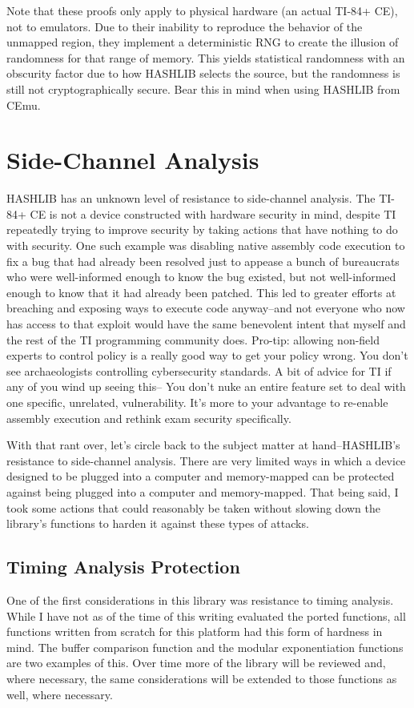 \documentclass[titlepage]{article}
\begin{document}
	Note that these proofs only apply to physical hardware (an actual TI-84+ CE), not to emulators. Due to their inability to reproduce the behavior of the unmapped region, they implement a deterministic RNG to create the illusion of randomness for that range of memory. This yields statistical randomness with an obscurity factor due to how HASHLIB selects the source, but the randomness is still not cryptographically secure. Bear this in mind when using HASHLIB from CEmu.
	
	\section{Side-Channel Analysis}
		HASHLIB has an unknown level of resistance to side-channel analysis. The TI-84+ CE is not a device constructed with hardware security in mind, despite TI repeatedly trying to improve security by taking actions that have nothing to do with security. One such example was disabling native assembly code execution to fix a bug that had already been resolved just to appease a bunch of bureaucrats who were well-informed enough to know the bug existed, but not well-informed enough to know that it had already been patched. This led to greater efforts at breaching and exposing ways to execute code anyway--and not everyone who now has access to that exploit would have the same benevolent intent that myself and the rest of the TI programming community does. Pro-tip: allowing non-field experts to control policy is a really good way to get your policy wrong. You don't see archaeologists controlling cybersecurity standards. A bit of advice for TI if any of you wind up seeing this-- You don't nuke an entire feature set to deal with one specific, unrelated, vulnerability. It's more to your advantage to re-enable assembly execution and rethink exam security specifically.
		
		With that rant over, let's circle back to the subject matter at hand--HASHLIB's resistance to side-channel analysis. There are very limited ways in which a device designed to be plugged into a computer and memory-mapped can be protected against being plugged into a computer and memory-mapped. That being said, I took some actions that could reasonably be taken without slowing down the library's functions to harden it against these types of attacks.
		
		\subsection{Timing Analysis Protection}
			One of the first considerations in this library was resistance to timing analysis. While I have not as of the time of this writing evaluated the ported functions, all functions written from scratch for this platform had this form of hardness in mind. The buffer comparison function and the modular exponentiation functions are two examples of this. Over time more of the library will be reviewed and, where necessary, the same considerations will be extended to those functions as well, where necessary.
		
\end{document}
